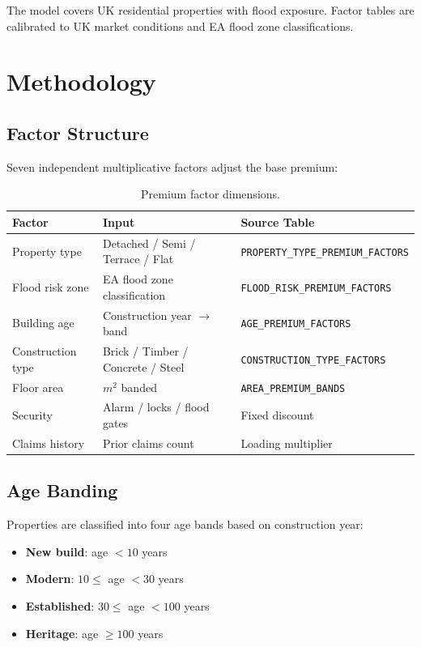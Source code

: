 \documentclass[11pt,a4paper]{article}
\begin{document}
The model covers UK residential properties with flood exposure. Factor tables
are calibrated to UK market conditions and EA flood zone classifications.


\section{Methodology}

\subsection{Factor Structure}

Seven independent multiplicative factors adjust the base premium:

\begin{table}[H]
    \centering
    \caption{Premium factor dimensions.}
    \begin{tabular}{lll}
        \toprule
        \textbf{Factor} & \textbf{Input} & \textbf{Source Table} \\
        \midrule
        Property type & Detached / Semi / Terrace / Flat & \texttt{PROPERTY\_TYPE\_PREMIUM\_FACTORS} \\
        Flood risk zone & EA flood zone classification & \texttt{FLOOD\_RISK\_PREMIUM\_FACTORS} \\
        Building age & Construction year $\to$ band & \texttt{AGE\_PREMIUM\_FACTORS} \\
        Construction type & Brick / Timber / Concrete / Steel & \texttt{CONSTRUCTION\_TYPE\_FACTORS} \\
        Floor area & $m^2$ banded & \texttt{AREA\_PREMIUM\_BANDS} \\
        Security & Alarm / locks / flood gates & Fixed discount \\
        Claims history & Prior claims count & Loading multiplier \\
        \bottomrule
    \end{tabular}
\end{table}

\subsection{Age Banding}

Properties are classified into four age bands based on construction year:
\begin{itemize}[nosep]
    \item \textbf{New build}: age $< 10$ years
    \item \textbf{Modern}: $10 \leq$ age $< 30$ years
    \item \textbf{Established}: $30 \leq$ age $< 100$ years
    \item \textbf{Heritage}: age $\geq 100$ years
\end{itemize}
\end{document}

